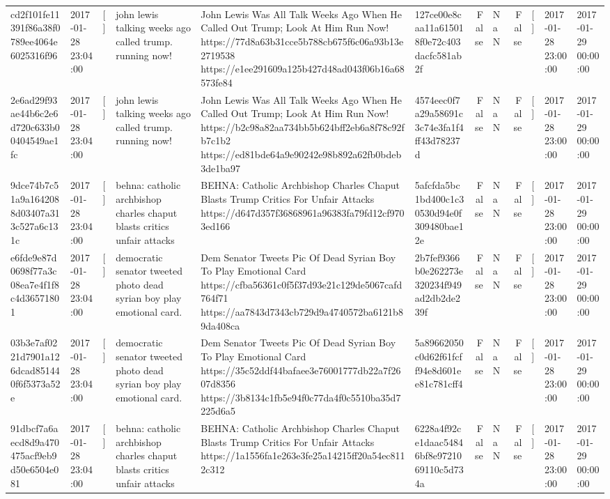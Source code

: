 \begin{tabular}{llllllrlrlll}
cd2f101fe11391f86a38f0789ee4064e6025316f96 & 2017-01-28 23:04:00 & [] & john lewis talking weeks ago called trump. running now! & John Lewis Was All Talk Weeks Ago When He Called Out Trump; Look At Him Run Now! https://77d8a63b31cce5b788cb675f6c06a93b13e2719538 https://e1ee291609a125b427d48ad043f06b16a68573fe84 & 127ce00e8caa11a615018f0e72c403dacfc581ab2f & False & NaN & False & [] & 2017-01-28 23:00:00 & 2017-01-29 00:00:00 \\
2e6ad29f93ae44b6c2e6d720c633b00404549ae1fc & 2017-01-28 23:04:00 & [] & john lewis talking weeks ago called trump. running now! & John Lewis Was All Talk Weeks Ago When He Called Out Trump; Look At Him Run Now! https://b2c98a82aa734bb5b624bff2eb6a8f78c92fb7c1b2 https://ed81bde64a9e90242e98b892a62fb0bdeb3de1ba97 & 4574eec0f7a29a58691c3c74e3fa1f4ff43d78237d & False & NaN & False & [] & 2017-01-28 23:00:00 & 2017-01-29 00:00:00 \\
9dce74b7c51a9a1642088d03407a313c527a6c131c & 2017-01-28 23:04:00 & [] & behna: catholic archbishop charles chaput blasts critics unfair attacks & BEHNA: Catholic Archbishop Charles Chaput Blasts Trump Critics For Unfair Attacks https://d647d357f36868961a96383fa79fd12cf9703ed166 & 5afcfda5bc1bd400c1c30530d94e0f309480bae12e & False & NaN & False & [] & 2017-01-28 23:00:00 & 2017-01-29 00:00:00 \\
e6fde9e87d0698f77a3c08ea7e4f1f8c4d36571801 & 2017-01-28 23:04:00 & [] & democratic senator tweeted photo dead syrian boy play emotional card. & Dem Senator Tweets Pic Of Dead Syrian Boy To Play Emotional Card https://cfba56361c0f5f37d93e21c129de5067cafd764f71 https://aa7843d7343cb729d9a4740572ba6121b89da408ca & 2b7fef9366b0e262273e320234f949ad2db2de239f & False & NaN & False & [] & 2017-01-28 23:00:00 & 2017-01-29 00:00:00 \\
03b3e7af0221d7901a126dcad851440f6f5373a52e & 2017-01-28 23:04:00 & [] & democratic senator tweeted photo dead syrian boy play emotional card. & Dem Senator Tweets Pic Of Dead Syrian Boy To Play Emotional Card https://35c52ddf44bafaee3e76001777db22a7f2607d8356 https://3b8134c1fb5e94f0c77da4f0c5510ba35d7225d6a5 & 5a89662050c0d62f61fcff94e8d601ee81c781cff4 & False & NaN & False & [] & 2017-01-28 23:00:00 & 2017-01-29 00:00:00 \\
91dbcf7a6aecd8d9a470475acf9eb9d50e6504e081 & 2017-01-28 23:04:00 & [] & behna: catholic archbishop charles chaput blasts critics unfair attacks & BEHNA: Catholic Archbishop Charles Chaput Blasts Trump Critics For Unfair Attacks https://1a1556fa1e263e3fe25a14215ff20a54ec8112c312 & 6228a4f92ce1daac54846bf8e9721069110c5d734a & False & NaN & False & [] & 2017-01-28 23:00:00 & 2017-01-29 00:00:00 \\

\end{tabular}
